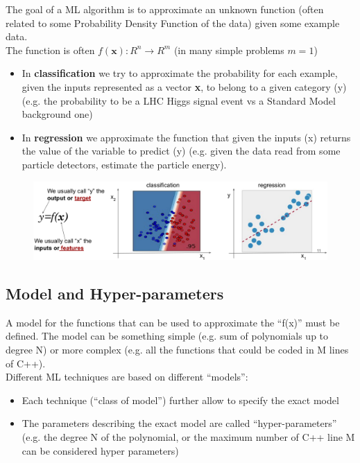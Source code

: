 The goal of a ML algorithm is to approximate an unknown function (often related to some Probability Density Function of the data) given some example data.\\
The function is often $ f(\textbf{x}): R^n \rightarrow R^m$ (in many simple problems $m=1$)
\begin{itemize}
	\item In \textbf{classification} we try to approximate the probability for each example, given the inputs represented as a vector \textbf{x}, to belong to a given category (y) (e.g. the probability to be a LHC Higgs signal event vs a Standard Model background one)
	\item In \textbf{regression} we approximate the function that given the inputs (x) returns the value of the variable to predict (y) (e.g. given the data read from some particle detectors, estimate the particle energy).
\end{itemize}

\begin{figure}[ht]
	\centering
	\includegraphics[width=1\textwidth]{figure_ml/function_approx.png}
\end{figure}
\FloatBarrier

\subsection{Model and Hyper-parameters}
A model for the functions that can be used to approximate the “f(x)” must be defined. The model can be something simple (e.g. sum of polynomials up to degree N) or more complex (e.g. all the functions that could be coded in M lines of C++).\\
Different ML techniques are based on different “models”:
\begin{itemize}
	\item Each technique (“class of model”) further allow to specify the exact model
	\item The parameters describing the exact model are called “hyper-parameters” (e.g. the degree N of the polynomial, or the maximum number of C++ line M can be considered hyper
	parameters)
\end{itemize}

